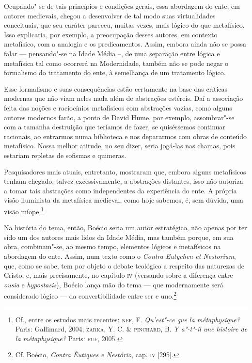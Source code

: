 Ocupando"-se de tais princípios e condições gerais, essa abordagem
do ente, em autores medievais, chegou a desenvolver de tal modo
suas virtualidades conceituais, que seu caráter pareceu, muitas
vezes, mais lógico do que metafísico. Isso explicaria, por
exemplo, a preocupação desses autores, em contexto metafísico,
com a analogia e os predicamentos. Assim, embora ainda não se
possa falar --- pensando"-se na Idade Média --, de uma separação
entre lógica e metafísica tal como ocorrerá na Modernidade,
também não se pode negar o formalismo do tratamento do ente, à
semelhança de um tratamento lógico.

Esse formalismo e suas consequências estão certamente na base das
críticas modernas que não viam neles nada além de abstrações
estéreis. Daí a associação feita das noções e raciocínios
metafísicos com abstrações vazias, como alguns autores modernos
farão, a ponto de David Hume, por exemplo, assombrar"-se com a
tamanha destruição que teríamos de fazer, se quiséssemos
continuar racionais, ao entrarmos numa biblioteca e nos
depararmos com obras de conteúdo metafísico. Nossa melhor
atitude, no seu dizer, seria jogá-las nas chamas, pois estariam
repletas de sofismas e quimeras.

Pesquisadores mais atuais, entretanto, mostraram que, embora
alguns metafísicos tenham chegado, talvez excessivamente, a
abstrações distantes, isso não autoriza a tomar tais abstrações
como independentes da experiência do ente. A própria visão
iluminista da metafísica medieval, como hoje sabemos, é, sem
dúvida, uma visão míope.\footnote{ Cf., entre os estudos mais
recentes: \textsc{nef}, F. \emph{Qu'est"-ce que la métaphysique?} Paris:
Gallimard, 2004; \textsc{zarka}, Y. C. \& \textsc{pinchard}, B. \emph{Y a"-t"-il
une histoire de la métaphysique?} Paris: \textsc{puf}, 2005.}

Na história do tema, então, Boécio seria um autor estratégico,
não apenas por ter sido um dos autores mais lidos da Idade
Média, mas também porque, em sua obra, combinam"-se, ao mesmo
tempo, elementos lógicos e metafísicos na abordagem do ente.
Assim, num texto como o \emph{Contra Eutychen et Nestorium},
que, como se sabe, tem por objeto o debate teológico a respeito
das naturezas de Cristo, e, mais precisamente, no capítulo \textsc{iv}
(versando sobre a diferença entre \emph{ousia} e
\emph{hypostasis}), Boécio lança mão do tema --- que
modernamente será considerado lógico --- da convertibilidade entre
ser e uno.\footnote{ Cf. Boécio, \emph{Contra Êutiques e
Nestório}, cap. \textsc{iv} [295].}

